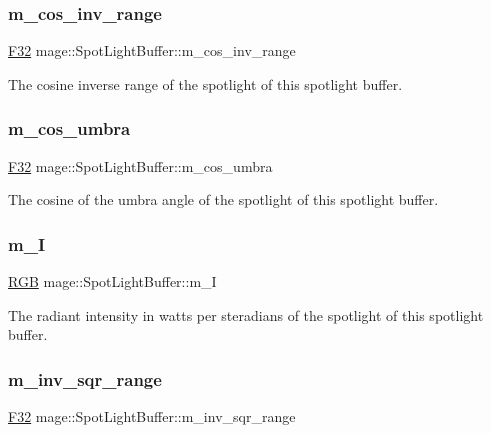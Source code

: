 \subsubsection{\texorpdfstring{m\+\_\+cos\+\_\+inv\+\_\+range}{m\_cos\_inv\_range}}
{\footnotesize\ttfamily \hyperlink{namespacemage_aa97e833b45f06d60a0a9c4fc22ae02c0}{F32} mage\+::\+Spot\+Light\+Buffer\+::m\+\_\+cos\+\_\+inv\+\_\+range}

The cosine inverse range of the spotlight of this spotlight buffer. \hypertarget{structmage_1_1_spot_light_buffer_a7f12f0a2f82b99253e4ae9aff259b3ed}{}\label{structmage_1_1_spot_light_buffer_a7f12f0a2f82b99253e4ae9aff259b3ed} 
\subsubsection{\texorpdfstring{m\+\_\+cos\+\_\+umbra}{m\_cos\_umbra}}
{\footnotesize\ttfamily \hyperlink{namespacemage_aa97e833b45f06d60a0a9c4fc22ae02c0}{F32} mage\+::\+Spot\+Light\+Buffer\+::m\+\_\+cos\+\_\+umbra}

The cosine of the umbra angle of the spotlight of this spotlight buffer. \hypertarget{structmage_1_1_spot_light_buffer_a1a119e91bb6ab012b8b9453d62fd8231}{}\label{structmage_1_1_spot_light_buffer_a1a119e91bb6ab012b8b9453d62fd8231} 
\subsubsection{\texorpdfstring{m\+\_\+I}{m\_I}}
{\footnotesize\ttfamily \hyperlink{structmage_1_1_r_g_b}{R\+GB} mage\+::\+Spot\+Light\+Buffer\+::m\+\_\+I}

The radiant intensity in watts per steradians of the spotlight of this spotlight buffer. \hypertarget{structmage_1_1_spot_light_buffer_ab4039d0e1761aba882126c8fd34f309c}{}\label{structmage_1_1_spot_light_buffer_ab4039d0e1761aba882126c8fd34f309c} 
\subsubsection{\texorpdfstring{m\+\_\+inv\+\_\+sqr\+\_\+range}{m\_inv\_sqr\_range}}
{\footnotesize\ttfamily \hyperlink{namespacemage_aa97e833b45f06d60a0a9c4fc22ae02c0}{F32} mage\+::\+Spot\+Light\+Buffer\+::m\+\_\+inv\+\_\+sqr\+\_\+range}

